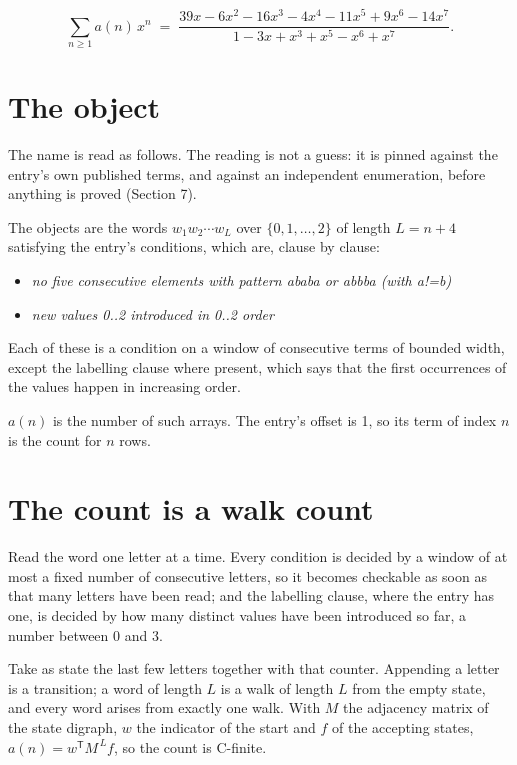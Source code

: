 \documentclass[11pt]{article}
\theoremstyle{definition}
\begin{document}
\[\sum_{n \ge 1} a(n)\,x^n \;=\; \frac{39x - 6x^{2} - 16x^{3} - 4x^{4} - 11x^{5} + 9x^{6} - 14x^{7}}{1 - 3x + x^{3} + x^{5} - x^{6} + x^{7}}.\]

\section{The object}

The name is read as follows. The reading is not a guess: it is pinned against the entry's own published terms, and against an independent enumeration, before anything is proved (Section 7).

The objects are the words $w_1 w_2 \cdots w_L$ over $\{0,1,\dots,2\}$ of length $L = n + 4$ satisfying the entry's conditions, which are, clause by clause:

\begin{itemize}

\item {\itshape no five consecutive elements with pattern ababa or abbba (with a!=b)}

\item {\itshape new values 0..2 introduced in 0..2 order}

\end{itemize}

Each of these is a condition on a window of consecutive terms of bounded width, except the labelling clause where present, which says that the first occurrences of the values happen in increasing order.

$a(n)$ is the number of such arrays. The entry's offset is 1, so its term of index $n$ is the count for $n$ rows.

\section{The count is a walk count}

Read the word one letter at a time. Every condition is decided by a window of at most a fixed number of consecutive letters, so it becomes checkable as soon as that many letters have been read; and the labelling clause, where the entry has one, is decided by how many distinct values have been introduced so far, a number between $0$ and 3.

Take as state the last few letters together with that counter. Appending a letter is a transition; a word of length $L$ is a walk of length $L$ from the empty state, and every word arises from exactly one walk. With $M$ the adjacency matrix of the state digraph, $w$ the indicator of the start and $f$ of the accepting states, $a(n) = w^{\mathsf T}M^{\,L}f$, so the count is C-finite.
\end{document}
